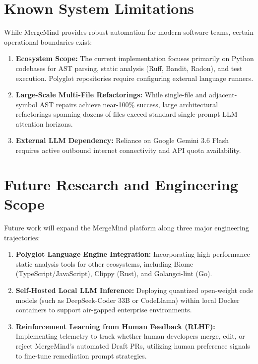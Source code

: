 \section{Known System Limitations}
\label{sec:limitations}

While MergeMind provides robust automation for modern software teams, certain operational boundaries exist:
\begin{enumerate}
    \item \textbf{Ecosystem Scope:} The current implementation focuses primarily on Python codebases for AST parsing, static analysis (Ruff, Bandit, Radon), and test execution. Polyglot repositories require configuring external language runners.
    \item \textbf{Large-Scale Multi-File Refactorings:} While single-file and adjacent-symbol AST repairs achieve near-100\% success, large architectural refactorings spanning dozens of files exceed standard single-prompt LLM attention horizons.
    \item \textbf{External LLM Dependency:} Reliance on Google Gemini 3.6 Flash requires active outbound internet connectivity and API quota availability.
\end{enumerate}

\section{Future Research and Engineering Scope}
\label{sec:future-scope}

Future work will expand the MergeMind platform along three major engineering trajectories:
\begin{enumerate}
    \item \textbf{Polyglot Language Engine Integration:} Incorporating high-performance static analysis tools for other ecosystems, including Biome (TypeScript/JavaScript), Clippy (Rust), and Golangci-lint (Go).
    \item \textbf{Self-Hosted Local LLM Inference:} Deploying quantized open-weight code models (such as DeepSeek-Coder 33B or CodeLlama) within local Docker containers to support air-gapped enterprise environments.
    \item \textbf{Reinforcement Learning from Human Feedback (RLHF):} Implementing telemetry to track whether human developers merge, edit, or reject MergeMind's automated Draft PRs, utilizing human preference signals to fine-tune remediation prompt strategies.
\end{enumerate}

